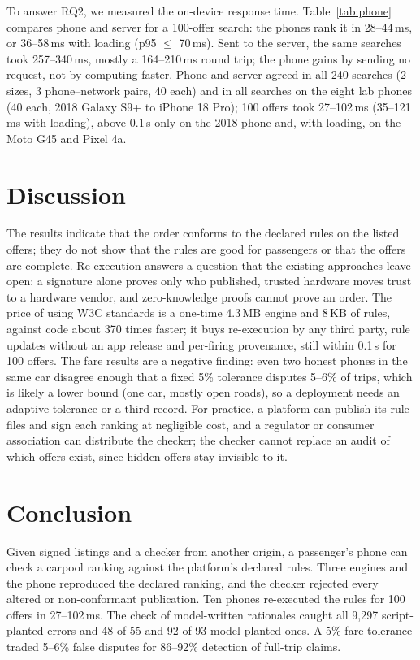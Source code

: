 \documentclass{svproc}
\begin{document}
To answer RQ2, we measured the on-device response time. Table~\ref{tab:phone} compares phone and server for a 100-offer search: the phones rank it in 28--44\,ms, or 36--58\,ms with loading (p95 $\le$ 70\,ms). Sent to the server, the same searches took 257--340\,ms, mostly a 164--210\,ms round trip; the phone gains by sending no request, not by computing faster. Phone and server agreed in all 240 searches (2 sizes, 3 phone--network pairs, 40 each) and in all searches on the eight lab phones (40 each, 2018 Galaxy S9+ to iPhone 18 Pro); 100 offers took 27--102\,ms (35--121\,ms with loading), above 0.1\,s only on the 2018 phone and, with loading, on the Moto G45 and Pixel 4a.

\section{Discussion}\label{sec:disc}
The results indicate that the order conforms to the declared rules on the listed offers; they do not show that the rules are good for passengers or that the offers are complete. Re-execution answers a question that the existing approaches leave open: a signature alone proves only who published, trusted hardware moves trust to a hardware vendor, and zero-knowledge proofs cannot prove an order. The price of using W3C standards is a one-time 4.3\,MB engine and 8\,KB of rules, against code about 370 times faster; it buys re-execution by any third party, rule updates without an app release and per-firing provenance, still within 0.1\,s for 100 offers. The fare results are a negative finding: even two honest phones in the same car disagree enough that a fixed 5\% tolerance disputes 5--6\% of trips, which is likely a lower bound (one car, mostly open roads), so a deployment needs an adaptive tolerance or a third record. For practice, a platform can publish its rule files and sign each ranking at negligible cost, and a regulator or consumer association can distribute the checker; the checker cannot replace an audit of which offers exist, since hidden offers stay invisible to it.

\section{Conclusion}\label{sec:concl}
Given signed listings and a checker from another origin, a passenger's phone can check a carpool ranking against the platform's declared rules. Three engines and the phone reproduced the declared ranking, and the checker rejected every altered or non-conformant publication. Ten phones re-executed the rules for 100 offers in 27--102\,ms. The check of model-written rationales caught all 9,297 script-planted errors and 48 of 55 and 92 of 93 model-planted ones. A 5\% fare tolerance traded 5--6\% false disputes for 86--92\% detection of full-trip claims.
\end{document}
